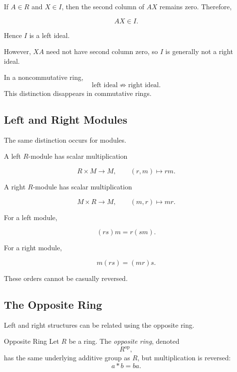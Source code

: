 If \(A\in R\) and \(X\in I\), then the second column of \(AX\) remains zero.
Therefore,

\[ AX\in I. \]

Hence \(I\) is a left ideal.

However, \(XA\) need not have second column zero, so \(I\) is generally not
a right ideal.

\begin{importantbox}
In a noncommutative ring,
\[ \text{left ideal}\not\Rightarrow\text{right ideal}. \]
This distinction disappears in commutative rings.
\end{importantbox}

\subsection{Left and Right Modules}
\label{subsec:left-right-modules}

The same distinction occurs for modules.

A left \(R\)-module has scalar multiplication

\[ R\times M\to M,\qquad(r,m)\mapsto rm. \]

A right \(R\)-module has scalar multiplication

\[ M\times R\to M,\qquad(m,r)\mapsto mr. \]

For a left module,

\[ (rs)m=r(sm). \]

For a right module,

\[ m(rs)=(mr)s. \]

These orders cannot be casually reversed.

\subsection{The Opposite Ring}
\label{subsec:opposite-ring}

Left and right structures can be related using the opposite ring.

\begin{definitionbox}{Opposite Ring}
Let \(R\) be a ring. The \emph{opposite ring}, denoted
\[ R^{\mathrm{op}}, \]
has the same underlying additive group as \(R\), but multiplication is
reversed:
\[ a\ast b=ba. \]
\end{definitionbox}

